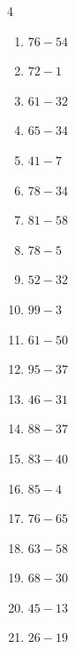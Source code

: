 \begin{multicols}{4}
\begin{enumerate}
  \item $76-54$
        \phantom{$=22$}

  \item $72-1$
        \phantom{$=71$}

\columnbreak %

\resetques

  \item $61-32$
        \phantom{$=29$}

  \item $65-34$
        \phantom{$=31$}

  \item $41-7$
        \phantom{$=34$}

  \item $78-34$
        \phantom{$=44$}

  \item $81-58$
        \phantom{$=23$}

  \item $78-5$
        \phantom{$=73$}

  \item $52-32$
        \phantom{$=20$}

  \item $99-3$
        \phantom{$=96$}

  \item $61-50$
        \phantom{$=11$}

  \item $95-37$
        \phantom{$=58$}

  \item $46-31$
        \phantom{$=15$}

  \item $88-37$
        \phantom{$=51$}

  \item $83-40$
        \phantom{$=43$}

  \item $85-4$
        \phantom{$=81$}

  \item $76-65$
        \phantom{$=11$}

  \item $63-58$
        \phantom{$=5$}

  \item $68-30$
        \phantom{$=38$}

  \item $45-13$
        \phantom{$=32$}

  \item $26-19$
        \phantom{$=7$}


\end{enumerate}
\end{multicols}
